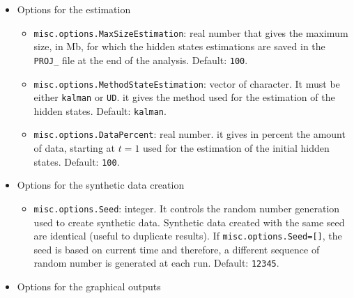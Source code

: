 \begin{itemize}
\begin{itemize}
\end{itemize}

\item Options for the estimation

\begin{itemize}
\item \lstinline[basicstyle = \mlttfamily \small ]!misc.options.MaxSizeEstimation!: real number that gives the maximum size, in Mb, for which the hidden states estimations are saved in the \lstinline[basicstyle = \mlttfamily \small ]!PROJ_! file at the end of the analysis. Default: \lstinline[basicstyle = \mlttfamily \small ]!100!.
\item \lstinline[basicstyle = \mlttfamily \small ]!misc.options.MethodStateEstimation!: vector of character. It must be either \lstinline[basicstyle = \mlttfamily \small ]!kalman! or \lstinline[basicstyle = \mlttfamily \small ]!UD!. it gives the method used for the estimation of the hidden states. Default: \lstinline[basicstyle = \mlttfamily \small ]!kalman!.
\item \lstinline[basicstyle = \mlttfamily \small ]!misc.options.DataPercent!: real number. it gives in percent the amount of data, starting at $t=1$ used for the estimation of the initial hidden states. Default: \lstinline[basicstyle = \mlttfamily \small ]!100!.
\end{itemize}


\item Options for the synthetic data creation

\begin{itemize}
\item \lstinline[basicstyle = \mlttfamily \small ]!misc.options.Seed!: integer. It controls the random number generation used to create synthetic data. Synthetic data created with the same seed are identical (useful to duplicate results). If  \lstinline[basicstyle = \mlttfamily \small ]!misc.options.Seed=[]!, the seed is based on current time and therefore, a different sequence of random number  is generated at each run. Default: \lstinline[basicstyle = \mlttfamily \small ]!12345!.
\end{itemize}

\item Options for the graphical outputs


\end{itemize}
